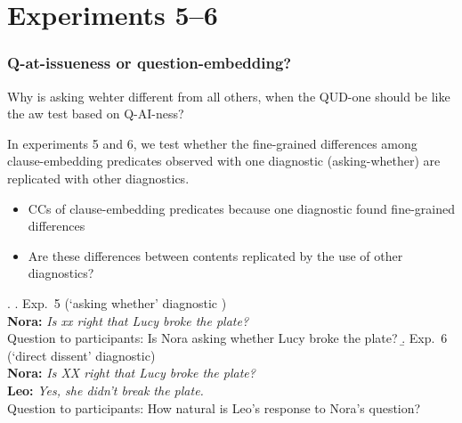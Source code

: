 \documentclass[compress, xcolor = dvipsnames, aspectratio=169]{beamer}
\begin{document}
\section{Experiments 5--6}
	\begin{frame}[t]\frametitle{Q-at-issueness or question-embedding?}\scriptsize
		
		Why is asking wehter different from all others, when the QUD-one should be like the aw test based on Q-AI-ness?

		In experiments 5 and 6, we test whether the fine-grained differences among clause-embedding predicates observed with one diagnostic (asking-whether) are replicated with other diagnostics.
		  \begin{itemize}
		    \item CCs of clause-embedding predicates because one diagnostic found fine-grained differences
		    \item Are these differences between contents replicated by the use of other diagnostics?
		  \end{itemize}

		\ex.
	    \a.\label{exp5} Exp.~5 (`asking whether' diagnostic )
	    \\ {\bf Nora:} \emph{Is xx right that Lucy broke the plate?}
	    \\ Question to participants: Is Nora asking whether Lucy broke the plate?
	    \b.\label{exp6} Exp.~6 (`direct dissent' diagnostic)
	    \\ {\bf Nora:} \emph{Is XX right that Lucy broke the plate?}
	    \\ {\bf Leo:} \emph{Yes, she didn't break the plate.}
	    \\ Question to participants: How natural is Leo's response to Nora's question?
	
	\end{frame}
\end{document}

